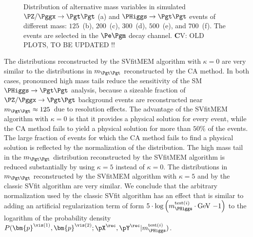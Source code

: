\begin{figure}
\begin{center}
\end{center}
\caption{
  Distribution of alternative mass variables in simulated $\PZ/\Pggx
  \to \Pgt\Pgt$ (a) and $\PHiggs \to \Pgt\Pgt$ events of different mass:
  $125$~\GeV (b), $200$~\GeV (c), $300$~\GeV (d), $500$~\GeV (e), and
  $700$~\GeV (f).
  The events are selected in the $\Pe\Pgm$ decay channel.
  {\textbf CV: OLD PLOTS, TO BE UPDATED !!}
}
\label{fig:massDistributions_emu}
\end{figure}

The distributions reconstructed by the SVfitMEM algorithm with $\kappa = 0$ are very similar to the distributions in $m_{\Pgt\Pgt}$ reconstructed by the CA method.
In both cases, pronounced high mass tails reduce the sensitivity of the SM $\PHiggs \to \Pgt\Pgt$ analysis,
because a sizeable fraction of $\PZ/\Pggx \to \Pgt\Pgt$ background events
are reconstructed near $m_{\Pgt\Pgt} \approx 125$~\GeV due to resolution effects.
The advantage of the SVfitMEM algorithm with $\kappa =
0$ is that it provides a physical solution for every event,
while the CA method fails to yield a physical solution for more than $50\%$ of the events.
The large fraction of events for which the CA method fails to find a physical solution is reflected by the normalization of the distribution.
The high mass tail in the $m_{\Pgt\Pgt}$ distribution reconstructed by
the SVfitMEM algorithm is reduced substantially by using
$\kappa = 5$ instead of $\kappa = 0$.
The distributions in $m_{\Pgt\Pgt}$ reconstructed by the SVfitMEM
algorithm with $\kappa = 5$ and by the classic SVfit algorithm are
very similar.
We conclude that the arbitrary normalization used by the classic SVfit
algorithm has an effect that is similar to adding 
an artificial regularization term of form $5 \cdot \log \left( m_{\PHiggs}^{\textrm{test}(i)} \cdot \mbox{GeV}~{-1} \right)$ to the logarithm of the probability
density $P(\bm{p}^{\vis(1)},\bm{p}^{\vis(2)};\pX^{\rec},\pY^{\rec}|m_{\PHiggs}^{\textrm{test}(i)})$.

